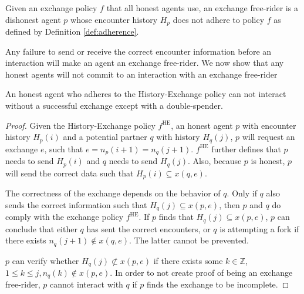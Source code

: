 \begin{defn}
    \label{def:gos_free-rider}
    Given an exchange policy $f$ that all honest agents use, an exchange free-rider is a dishonest 
    agent $p$ whose encounter history $H_p$ does not adhere to policy $f$ as defined by Definition \ref{def:adherence}.
\end{defn}

Any failure to send or receive the correct encounter information before an interaction will make 
an agent an exchange free-rider.
We now show that any honest agents will not commit to an interaction with an exchange free-rider

\begin{thm}
    \label{thm:no_interaction}
    An honest agent who adheres to the History-Exchange policy can not interact without a successful 
    exchange except with a double-spender.
\end{thm}
\begin{proof}
    Given the History-Exchange policy $f^{\text{HE}}$, an honest agent $p$ with encounter history $H_p(i)$ and a potential 
    partner $q$ with history $H_q(j)$, $p$ will request an exchange $e$, such 
    that $e = n_p(i+1) = n_q(j+1)$. 
    $f^{\text{HE}}$ further defines that $p$ needs to send $H_p(i)$ and $q$ needs to send $H_q(j)$.
    Also, because $p$ is honest, $p$ will send the correct data such that $H_p(i) \subseteq x(q,e)$. 
    
    The correctness of the exchange depends on the behavior of $q$.
    Only if $q$ also sends the correct information such that $H_q(j) \subseteq x(p,e)$, then $p$ and $q$ do comply with 
    the exchange policy $f^{\text{HE}}$. If 
    $p$ finds that $H_q(j) \subseteq x(p,e)$, $p$ can conclude that either $q$ has sent the correct
    encounters, or $q$ is attempting a fork if there exists $n_q(j+1) \notin x(q,e)$. The latter cannot
    be prevented.
    
    $p$ can verify whether $H_q(j) \not\subset x(p,e)$ if there exists some $k \in \mathbb{Z}$, $1 \leq k \leq j, n_q(k) \notin x(p,e)$. 
    In order to not create proof of being an exchange free-rider, $p$ cannot interact with $q$ if 
    $p$ finds the exchange to be incomplete.
\end{proof}

